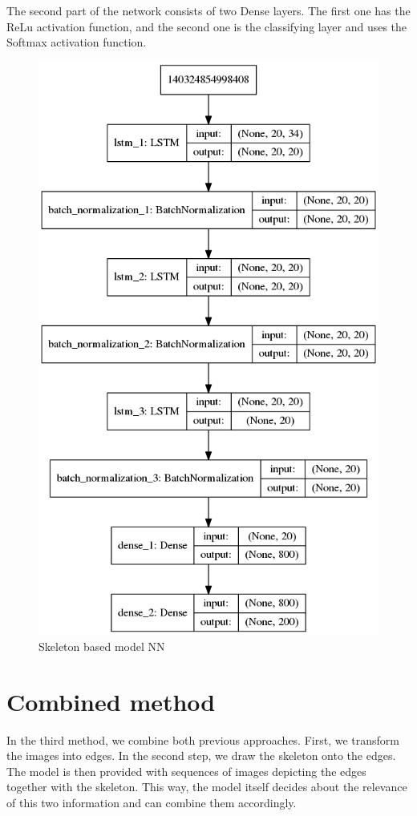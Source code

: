 The second part of the network consists of two Dense layers. The first one has the ReLu activation function, and the second one is the classifying layer and uses the Softmax activation function.

\begin{figure}[h!]
    \centering
    \includegraphics[scale=0.4]{figures/model_kpts.png}
    \caption{Skeleton based model NN}
    \label{fig:skeleton_based_model}
\end{figure}

\section{Combined method}
In the third method, we combine both previous approaches. First, we transform the images into edges. In the second step, we draw the skeleton onto the edges. The model is then provided with sequences of images depicting the edges together with the skeleton. This way, the model itself decides about the relevance of this two information and can combine them accordingly.

